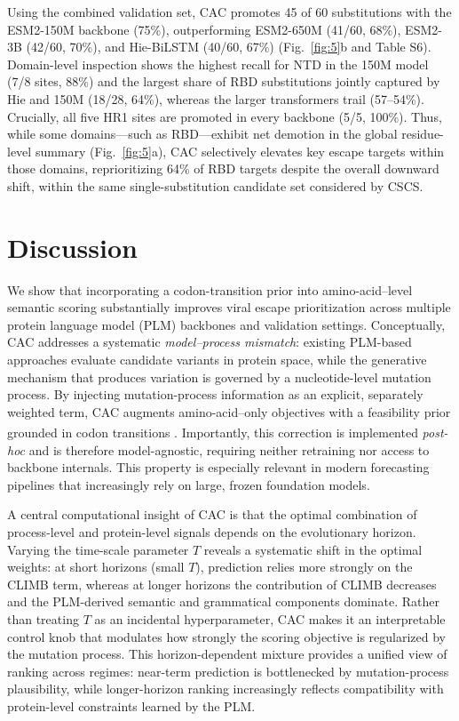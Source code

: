 \documentclass[pdflatex,sn-nature]{sn-jnl}
\renewcommand\cite[1]{\unskip\textsuperscript{\citep{#1}}}
\begin{document}
Using the combined validation set, CAC promotes 45 of 60 substitutions with the ESM2-150M backbone (75\%), outperforming ESM2-650M (41/60, 68\%), ESM2-3B (42/60, 70\%), and Hie-BiLSTM (40/60, 67\%) (Fig.~\ref{fig:5}b and Table S6). Domain-level inspection shows the highest recall for NTD in the 150M model (7/8 sites, 88\%) and the largest share of RBD substitutions jointly captured by Hie and 150M (18/28, 64\%), whereas the larger transformers trail (57--54\%). Crucially, all five HR1 sites are promoted in every backbone (5/5, 100\%). Thus, while some domains---such as RBD---exhibit net demotion in the global residue-level summary (Fig.~\ref{fig:5}a), CAC selectively elevates key escape targets within those domains, reprioritizing 64\% of RBD targets despite the overall downward shift, within the same single-substitution candidate set considered by CSCS.


\section*{Discussion}

We show that incorporating a codon-transition prior into amino-acid--level semantic scoring substantially improves viral escape prioritization across multiple protein language model (PLM) backbones and validation settings. Conceptually, CAC addresses a systematic \emph{model--process mismatch}: existing PLM-based approaches evaluate candidate variants in protein space, while the generative mechanism that produces variation is governed by a nucleotide-level mutation process. By injecting mutation-process information as an explicit, separately weighted term, CAC augments amino-acid--only objectives with a feasibility prior grounded in codon transitions \cite{Halpern1998, Rodrigue2010}. Importantly, this correction is implemented \emph{post-hoc} and is therefore model-agnostic, requiring neither retraining nor access to backbone internals. This property is especially relevant in modern forecasting pipelines that increasingly rely on large, frozen foundation models.

A central computational insight of CAC is that the optimal combination of process-level and protein-level signals depends on the evolutionary horizon. Varying the time-scale parameter $T$ reveals a systematic shift in the optimal weights: at short horizons (small $T$), prediction relies more strongly on the CLIMB term, whereas at longer horizons the contribution of CLIMB decreases and the PLM-derived semantic and grammatical components dominate. Rather than treating $T$ as an incidental hyperparameter, CAC makes it an interpretable control knob that modulates how strongly the scoring objective is regularized by the mutation process. This horizon-dependent mixture provides a unified view of ranking across regimes: near-term prediction is bottlenecked by mutation-process plausibility, while longer-horizon ranking increasingly reflects compatibility with protein-level constraints learned by the PLM.
\end{document}
